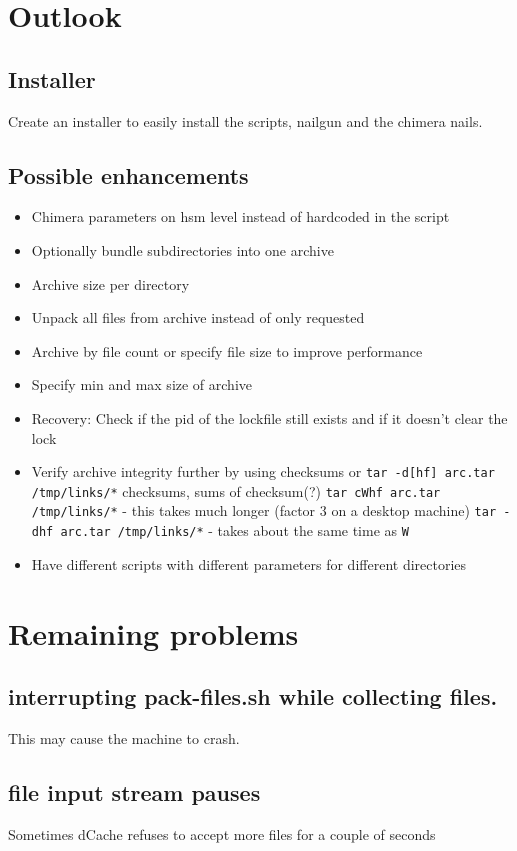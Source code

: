 \documentclass[a4paper,8pt]{scrartcl}
\begin{document}
\section{Outlook}

\subsection{Installer}
Create an installer to easily install the scripts, nailgun and the chimera nails.

\subsection{Possible enhancements}
\begin{itemize}
  \item Chimera parameters on hsm level instead of hardcoded in the script
  \item Optionally bundle subdirectories into one archive
  \item Archive size per directory
  \item Unpack all files from archive instead of only requested
  \item Archive by file count or specify file size to improve performance
  \item Specify min and max size of archive
  \item Recovery: Check if the pid of the lockfile still exists and if it
    doesn't clear the lock
  \item Verify archive integrity further by using checksums or \texttt{tar
    -d[hf] arc.tar /tmp/links/*}
    \subitem checksums, sums of checksum(?)
    \subitem \texttt{tar cWhf arc.tar /tmp/links/*} - this takes much longer
    (factor 3 on a desktop machine)
    \subitem \texttt{tar -dhf arc.tar /tmp/links/*} - takes about the same time
    as \texttt{W}
  \item Have different scripts with different parameters for different
    directories
\end{itemize}

\section{Remaining problems}

\subsection{interrupting pack-files.sh while collecting files.}
This may cause the machine to crash.

\subsection{file input stream pauses}
Sometimes dCache refuses to accept more files for a couple of seconds
\end{document}
